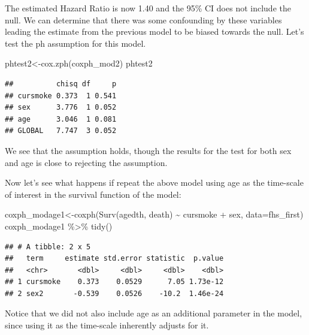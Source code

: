 \documentclass[
]{book}
\newenvironment{Shaded}{\begin{snugshade}}{\end{snugshade}}
\newcommand{\AttributeTok}[1]{\textcolor[rgb]{0.77,0.63,0.00}{#1}}
\newcommand{\FunctionTok}[1]{\textcolor[rgb]{0.00,0.00,0.00}{#1}}
\newcommand{\NormalTok}[1]{#1}
\newcommand{\OtherTok}[1]{\textcolor[rgb]{0.56,0.35,0.01}{#1}}
\newcommand{\SpecialCharTok}[1]{\textcolor[rgb]{0.00,0.00,0.00}{#1}}
\begin{document}
The estimated Hazard Ratio is now 1.40 and the 95\% CI does not include the null. We can determine that there was some confounding by these variables leading the estimate from the previous model to be biased towards the null. Let's test the ph assumption for this model.

\begin{Shaded}
\begin{Highlighting}[]
\NormalTok{phtest2}\OtherTok{\textless{}{-}}\FunctionTok{cox.zph}\NormalTok{(coxph\_mod2)}
\NormalTok{phtest2}
\end{Highlighting}
\end{Shaded}

\begin{verbatim}
##          chisq df     p
## cursmoke 0.373  1 0.541
## sex      3.776  1 0.052
## age      3.046  1 0.081
## GLOBAL   7.747  3 0.052
\end{verbatim}

We see that the assumption holds, though the results for the test for both sex and age is close to rejecting the assumption.

Now let's see what happens if repeat the above model using age as the time-scale of interest in the survival function of the model:

\begin{Shaded}
\begin{Highlighting}[]
\NormalTok{coxph\_modage1}\OtherTok{\textless{}{-}}\FunctionTok{coxph}\NormalTok{(}\FunctionTok{Surv}\NormalTok{(agedth, death) }\SpecialCharTok{\textasciitilde{}}\NormalTok{ cursmoke }\SpecialCharTok{+}\NormalTok{ sex, }\AttributeTok{data=}\NormalTok{fhs\_first)}
\NormalTok{coxph\_modage1 }\SpecialCharTok{\%\textgreater{}\%}
\FunctionTok{tidy}\NormalTok{()}
\end{Highlighting}
\end{Shaded}

\begin{verbatim}
## # A tibble: 2 x 5
##   term     estimate std.error statistic  p.value
##   <chr>       <dbl>     <dbl>     <dbl>    <dbl>
## 1 cursmoke    0.373    0.0529      7.05 1.73e-12
## 2 sex2       -0.539    0.0526    -10.2  1.46e-24
\end{verbatim}

Notice that we did not also include age as an additional parameter in the model, since using it as the time-scale inherently adjusts for it.
\end{document}
